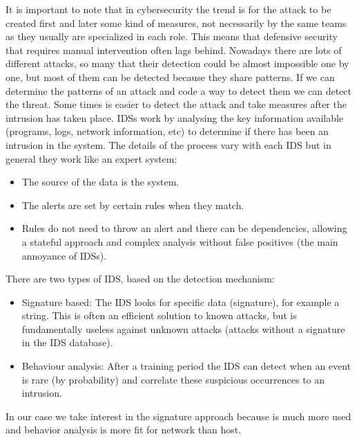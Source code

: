 \linej
\linej
It is important to note that in cybersecurity the trend is for the attack to be created first and later some kind of measures, not necessarily by the same teams as they usually are specialized in each role. This means that defensive security that requires manual intervention often lags behind.
\linej
Nowadays there are lots of different attacks, so many that their detection could be almost impossible one by one, but most of them can be detected because they share patterns. If we can determine the patterns of an attack and code a way to detect them we can detect the threat. Some times is easier to detect the attack and take measures after the intrusion has taken place.
\linej
\linej
IDSs work by analysing the key information available (programs, logs, network information, etc) to determine if there has been an intrusion in the system. The details of the process vary with each IDS but in general they work like an expert system:
\begin{itemize}
	\item The source of the data is the system.
	\item The alerts are set by certain rules when they match.
	\item Rules do not need to throw an alert and there can be dependencies, allowing a stateful approach and complex analysis without false positives (the main annoyance of IDSs).
\end{itemize}

\linej
There are two types of IDS, based on the detection mechanism:
\begin{itemize}
	\item Signature based: The IDS looks for specific data (signature), for example a string. This is often an efficient solution to known attacks, but is fundamentally useless against unknown attacks (attacks without a signature in the IDS database).
	\item Behaviour analysis: After a training period the IDS can detect when an event is rare (by probability) and correlate these suspicious occurrences to an intrusion.
\end{itemize}
In our case we take interest in the signature approach because is much more used and behavior analysis is more fit for network than host.

